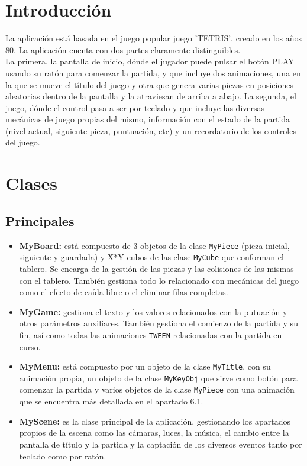 \documentclass[11pt,a4paper]{article}
\begin{document}
\section{Introducción}

La aplicación está basada en el juego popular juego 'TETRIS', creado en los años 80. La aplicación cuenta con dos partes claramente distinguibles. \\

La primera, la pantalla de inicio, dónde el jugador puede pulsar el botón PLAY usando su ratón para comenzar la partida, y que incluye dos animaciones, una en la que se mueve el título del juego y otra que genera varias piezas en posiciones aleatorias dentro de la pantalla y la atraviesan de arriba a abajo. La segunda, el juego, dónde el control pasa a ser por teclado y que incluye las diversas mecánicas de juego propias del mismo, información con el estado de la partida (nivel actual, siguiente pieza, puntuación, etc) y un recordatorio de los controles del juego.

\section{Clases}

    \subsection{Principales}
        \begin{itemize}
            \item \textbf{MyBoard:} está compuesto de 3 objetos de la clase \texttt{MyPiece} (pieza inicial, siguiente y guardada) y X*Y cubos de las clase \texttt{MyCube} que conforman el tablero. Se encarga de la gestión de las piezas y las colisiones de las mismas con el tablero. También gestiona todo lo relacionado con mecánicas del juego como el efecto de caída libre o el eliminar filas completas.
            \item \textbf{MyGame:} gestiona el texto y los valores relacionados con la putuación y otros parámetros auxiliares. También gestiona el comienzo de la partida y su fin, así como todas las animaciones \texttt{TWEEN} relacionadas con la partida en curso.
            \item \textbf{MyMenu:} está compuesto por un objeto de la clase \texttt{MyTitle}, con su animación propia, un objeto de la clase \texttt{MyKeyObj} que sirve como botón para comenzar la partida y varios objetos de la clase \texttt{MyPiece} con una animación que se encuentra más detallada en el apartado 6.1.
            \item \textbf{MyScene:} es la clase principal de la aplicación, gestionando los apartados propios de la escena como las cámaras, luces, la música, el cambio entre la pantalla de título y la partida y la captación de los diversos eventos tanto por teclado como por ratón. 
        \end{itemize}
\end{document}

